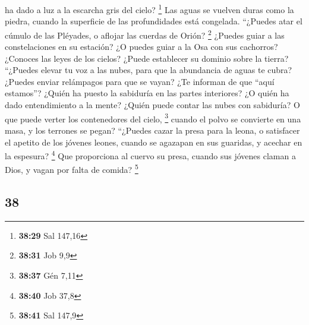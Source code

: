 \begin{paracol}{2}
ha dado a luz a la escarcha gris del cielo? \footnote{\textbf{38:29} Sal
  147,16}  Las aguas se vuelven duras como la piedra,
cuando la superficie de las profundidades está congelada.
 ``¿Puedes atar el cúmulo de las Pléyades, o aflojar las
cuerdas de Orión? \footnote{\textbf{38:31} Job 9,9} 
¿Puedes guiar a las constelaciones en su estación? ¿O puedes guiar a la
Osa con sus cachorros?  ¿Conoces las leyes de los cielos?
¿Puede establecer su dominio sobre la tierra?  ``¿Puedes
elevar tu voz a las nubes, para que la abundancia de aguas te cubra?
 ¿Puedes enviar relámpagos para que se vayan? ¿Te
informan de que ``aquí estamos''?  ¿Quién ha puesto la
sabiduría en las partes interiores? ¿O quién ha dado entendimiento a la
mente?  ¿Quién puede contar las nubes con sabiduría? O
que puede verter los contenedores del cielo, \footnote{\textbf{38:37}
  Gén 7,11}  cuando el polvo se convierte en una masa, y
los terrones se pegan?  ``¿Puedes cazar la presa para la
leona, o satisfacer el apetito de los jóvenes leones, 
cuando se agazapan en sus guaridas, y acechar en la espesura?
\footnote{\textbf{38:40} Job 37,8}  Que proporciona al
cuervo su presa, cuando sus jóvenes claman a Dios, y vagan por falta de
comida? \footnote{\textbf{38:41} Sal 147,9}

\switchcolumn
\begin{otherlanguage}{english}

\hypertarget{section-75}{%
\section{38}\label{section-75}}


\end{otherlanguage}
\end{paracol}
